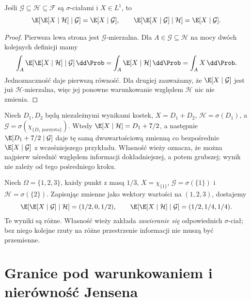 \begin{twierdzenie}
Jeśli $\mathcal G\subseteq\mathcal H\subseteq\mathcal F$
są $\sigma$-ciałami i $X\in L^1$, to
\[
\E[\E[X\mid\mathcal H]\mid\mathcal G]
=\E[X\mid\mathcal G],
\qquad
\E[\E[X\mid\mathcal G]\mid\mathcal H]
=\E[X\mid\mathcal G].
\]
\end{twierdzenie}
\begin{proof}
Pierwsza lewa strona jest $\mathcal G$-mierzalna.
Dla $A\in\mathcal G\subseteq\mathcal H$
na mocy dwóch kolejnych definicji mamy
\[
\int_A \E[\E[X\mid\mathcal H]\mid\mathcal G]
\,\dd\Prob
=\int_A\E[X\mid\mathcal H]\,\dd\Prob
=\int_A X\,\dd\Prob.
\]
Jednoznaczność daje pierwszą równość.
Dla drugiej zauważamy, że $\E[X\mid\mathcal G]$
jest już $\mathcal H$-mierzalna, więc jej ponowne
warunkowanie względem $\mathcal H$ nic nie zmienia.
\end{proof}

\begin{przyklad}
Niech $D_1,D_2$ będą niezależnymi wynikami kostek,
$X=D_1+D_2$, $\mathcal H=\sigma(D_1)$,
a $\mathcal G=\sigma(\chi_{\{D_1\text{ parzysta}\}})$.
Wtedy
$\E[X\mid\mathcal H]=D_1+7/2$,
a następnie $\E[D_1+7/2\mid\mathcal G]$
daje tę samą dwuwartościową zmienną co
bezpośrednie $\E[X\mid\mathcal G]$ z wcześniejszego
przykładu. Własność wieży oznacza, że można
najpierw uśrednić względem informacji dokładniejszej,
a potem grubszej; wynik nie zależy od tego
pośredniego kroku.
\end{przyklad}

\begin{przyklad}
Niech $\Omega=\{1,2,3\}$, każdy punkt z masą $1/3$,
$X=\chi_{\{1\}}$, $\mathcal G=\sigma(\{1\})$
i $\mathcal H=\sigma(\{2\})$.
Zapisując zmienne jako wektory wartości na
$(1,2,3)$, dostajemy
\[
\E[\E[X\mid\mathcal G]\mid\mathcal H]
=(1/2,0,1/2),\qquad
\E[\E[X\mid\mathcal H]\mid\mathcal G]
=(1/2,1/4,1/4).
\]
Te wyniki są różne. Własność wieży zakłada
\emph{zawieranie się} odpowiednich $\sigma$-ciał;
bez niego kolejne rzuty na różne przestrzenie
informacji nie muszą być przemienne.
\end{przyklad}

\section{Granice pod warunkowaniem i nierówność Jensena}

